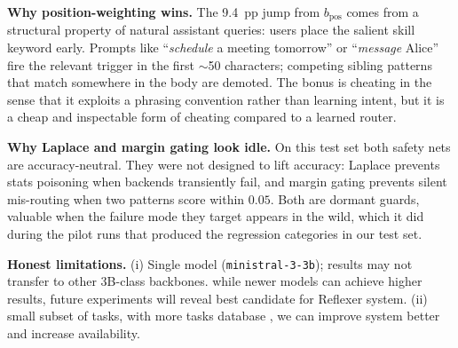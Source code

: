 \label{sec:disc}

\textbf{Why position-weighting wins.} The 9.4~pp jump from $b_{\text{pos}}$ comes from a structural property of natural assistant queries: users place the salient skill keyword early. Prompts like ``\emph{schedule} a meeting tomorrow'' or ``\emph{message} Alice'' fire the relevant trigger in the first $\sim$50 characters; competing sibling patterns that match somewhere in the body are demoted. The bonus is cheating in the sense that it exploits a phrasing convention rather than learning intent, but it is a cheap and inspectable form of cheating compared to a learned router.

\textbf{Why Laplace and margin gating look idle.} On this test set both safety nets are accuracy-neutral. They were not designed to lift accuracy: Laplace prevents stats poisoning when backends transiently fail, and margin gating prevents silent mis-routing when two patterns score within $0.05$. Both are dormant guards, valuable when the failure mode they target appears in the wild, which it did during the pilot runs that produced the regression categories in our test set.

\textbf{Honest limitations.} (i) Single model (\texttt{ministral-3-3b}); results may not transfer to other 3B-class backbones. while newer models can achieve higher results, future experiments will reveal best candidate for Reflexer system. (ii) small subset of tasks, with more tasks database , we can improve system better and increase availability.
